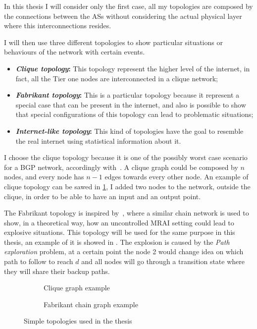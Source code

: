 In this thesis I will consider only the first case, all my topologies are composed by
the connections between the \acp{AS} without considering the actual physical layer
where this interconnections resides.

I will then use three different topologies to show particular situations or
behaviours of the network with certain events.
\begin{itemize}
	\item \textbf{\textit{Clique topology}:} This topology represent the higher
		level of the internet, in fact, all the Tier one nodes are interconnected
		in a clique network;
	\item \textbf{\textit{Fabrikant topology}:} This is a particular topology
		because it represent a special case that can be present in the internet,
		and also is possible to show that special configurations of this topology
		can lead to problematic situations;
	\item \textbf{\textit{Internet-like topology}:} This kind of topologies
		have the goal to resemble the real internet using statistical information
		about it.
\end{itemize}

I choose the clique topology because it is one of the possibly worst
case scenario for a \ac{BGP} network, accordingly with~\cite{labovitz2000delayed}.
A clique graph could be composed by $n$ nodes, and every node has
$n-1$ edges towards every other node.
An example of clique topology can be sawed in \cref{fig:clique_topology}, I added
two nodes to the network, outside the clique, in order to be able to have an
input and an output point.

The Fabrikant topology is inspired by~\cite{fabrikant2011there}, where
a similar chain network is used to show, in a theoretical way, how an uncontrolled
\ac{MRAI} setting could lead to explosive situations.
This topology will be used for the same purpose in this thesis, an example
of it is showed in .
The explosion is caused by the \textit{Path exploration} problem, at a certain
point the node \num{2} would change idea on which path to follow to reach $d$
and all nodes will go through a transition state where they will
share their backup paths.

\begin{figure}[ht]
     \centering
     \begin{subfigure}[b]{0.45\textwidth}
         \centering
		 
		 \caption{Clique graph example}
    	 \label{fig:clique_topology}
     \end{subfigure}
     \hfill
     \begin{subfigure}[b]{0.45\textwidth}
         \centering
         
		 \caption{Fabrikant chain graph example}
		 \label{fig:fabrikant_topology}
     \end{subfigure}
		\caption{Simple topologies used in the thesis}
        \label{fig:clique_and_fabrikant}
\end{figure}

